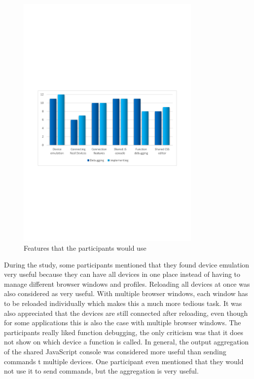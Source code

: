 \begin{figure}[H]
  \centering
    \includegraphics[width=0.8\textwidth]{images/charts/would_use_features.pdf}
	\caption[Features that participants would use]{Features that the participants would use}
	\label{fig:would_use_features}
\end{figure}

During the study, some participants mentioned that they found device emulation very useful because they can have all devices in one place instead of having to manage different browser windows and profiles. Reloading all devices at once was also considered as very useful. With multiple browser windows, each window has to be reloaded individually which makes this a much more tedious task. It was also appreciated that the devices are still connected after reloading, even though for some applications this is also the case with multiple browser windows. The participants really liked function debugging, the only criticism was that it does not show on which device a function is called. In general, the output aggregation of the shared JavaScript console was considered more useful than sending commands t multiple devices. One participant even mentioned that they would not use it to send commands, but the aggregation is very useful. 

